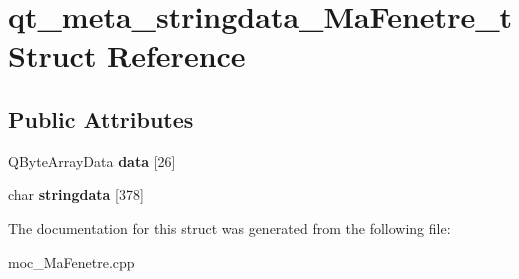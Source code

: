 \section{qt\-\_\-meta\-\_\-stringdata\-\_\-\-Ma\-Fenetre\-\_\-t Struct Reference}
\label{structqt__meta__stringdata___ma_fenetre__t}
\subsection*{Public Attributes}
\begin{DoxyCompactItemize}
\item 
Q\-Byte\-Array\-Data {\bfseries data} [26]\label{structqt__meta__stringdata___ma_fenetre__t_a2b45c081971bf71247603d87989b08ba}

\item 
char {\bfseries stringdata} [378]\label{structqt__meta__stringdata___ma_fenetre__t_a38fab870c198c5946222eb2f706d917c}

\end{DoxyCompactItemize}


The documentation for this struct was generated from the following file\-:\begin{DoxyCompactItemize}
\item 
moc\-\_\-\-Ma\-Fenetre.\-cpp\end{DoxyCompactItemize}
